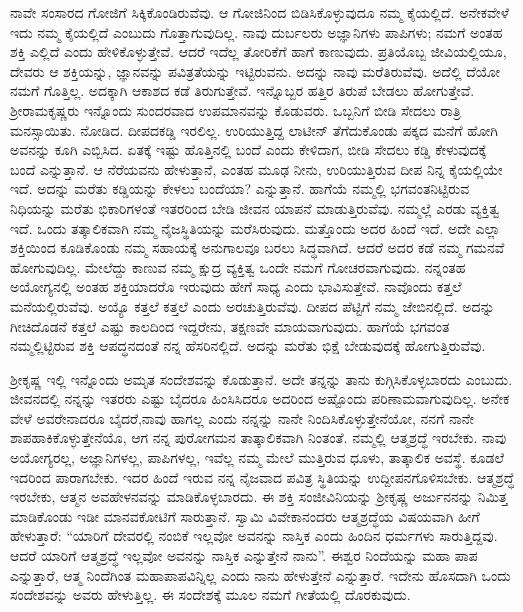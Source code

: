 ನಾವೇ ಸಂಸಾರದ ಗೋಜಿಗೆ ಸಿಕ್ಕಿಕೊಂಡಿರುವೆವು. ಆ ಗೋಜಿನಿಂದ ಬಿಡಿಸಿಕೊಳ್ಳುವುದೂ ನಮ್ಮ ಕೈಯಲ್ಲಿದೆ. ಅನೇಕವೇಳೆ ಇದು ನಮ್ಮ ಕೈಯಲ್ಲಿದೆ ಎಂಬುದು ಗೊತ್ತಾಗುವುದಿಲ್ಲ. ನಾವು ದುರ್ಬಲರು ಅಜ್ಞಾನಿಗಳು ಪಾಪಿಗಳು; ನಮಗೆ ಅಂತಹ ಶಕ್ತಿ ಎಲ್ಲಿದೆ ಎಂದು ಹೇಳಿಕೊಳ್ಳುತ್ತೇವೆ. ಆದರೆ ಇದೆಲ್ಲ ತೋರಿಕೆಗೆ ಹಾಗೆ ಕಾಣುವುದು. ಪ್ರತಿಯೊಬ್ಬ ಜೀವಿಯಲ್ಲಿಯೂ, ದೇವರು ಆ ಶಕ್ತಿಯನ್ನು, ಜ್ಞಾನವನ್ನು ಪವಿತ್ರತೆಯನ್ನು ಇಟ್ಟಿರುವನು. ಅದನ್ನು ನಾವು ಮರೆತಿರುವೆವು. ಅದೆಲ್ಲಿ ದೆಯೋ ನಮಗೆ ಗೊತ್ತಿಲ್ಲ. ಅದಕ್ಕಾಗಿ ಆಕಾಶದ ಕಡೆ ತಿರುಗುತ್ತೇವೆ. ಇನ್ನೊಬ್ಬರ ಹತ್ತಿರ ತಿರುಪೆ ಬೇಡಲು ಹೋಗುತ್ತೇವೆ. ಶ‍್ರೀರಾಮಕೃಷ್ಣರು ಇನ್ನೊಂದು ಸುಂದರವಾದ ಉಪಮಾನವನ್ನು ಕೊಡುವರು. ಒಬ್ಬನಿಗೆ ಬೀಡಿ ಸೇದಲು ರಾತ್ರಿ ಮನಸ್ಸಾಯಿತು. ನೋಡಿದ. ದೀಪದಕಡ್ಡಿ ಇರಲಿಲ್ಲ. ಉರಿಯುತ್ತಿದ್ದ ಲಾಟೀನ್ ತೆಗೆದುಕೊಂಡು ಪಕ್ಕದ ಮನೆಗೆ ಹೋಗಿ ಅವನನ್ನು ಕೂಗಿ ಎಬ್ಬಿಸಿದ. ಏತಕ್ಕೆ ಇಷ್ಟು ಹೊತ್ತಿನಲ್ಲಿ ಬಂದೆ ಎಂದು ಕೇಳಿದಾಗ, ಬೀಡಿ ಸೇದಲು ಕಡ್ಡಿ ಕೇಳುವುದಕ್ಕೆ ಬಂದೆ ಎನ್ನುತ್ತಾನೆ. ಆ ನೆರೆಯವನು ಹೇಳುತ್ತಾನೆ, ಎಂತಹ ಮೂಢ ನೀನು, ಉರಿಯುತ್ತಿರುವ ದೀಪ ನಿನ್ನ ಕೈಯಲ್ಲಿಯೇ ಇದೆ. ಅದನ್ನು ಮರೆತು ಕಡ್ಡಿಯನ್ನು ಕೇಳಲು ಬಂದೆಯಾ? ಎನ್ನುತ್ತಾನೆ. ಹಾಗೆಯೆ ನಮ್ಮಲ್ಲಿ ಭಗವಂತನಿಟ್ಟಿರುವ ನಿಧಿಯನ್ನು ಮರೆತು ಭಿಕಾರಿಗಳಂತೆ ಇತರರಿಂದ ಬೇಡಿ ಜೀವನ ಯಾಪನೆ ಮಾಡುತ್ತಿರುವೆವು. ನಮ್ಮಲ್ಲೆ ಎರಡು ವ್ಯಕ್ತಿತ್ವ ಇದೆ. ಒಂದು ತತ್ಕಾಲಿಕವಾಗಿ ನಮ್ಮ ನೈಜಸ್ಥಿತಿಯನ್ನು ಮರೆಸಿರುವುದು. ಮತ್ತೊಂದು ಅದರ ಹಿಂದೆ ಇದೆ. ಅದೇ ಎಲ್ಲಾ ಶಕ್ತಿಯಿಂದ ಕೂಡಿಕೊಂಡು ನಮ್ಮ ಸಹಾಯಕ್ಕೆ ಅನುಗಾಲವೂ ಬರಲು ಸಿದ್ಧವಾಗಿದೆ. ಆದರೆ ಅದರ ಕಡೆ ನಮ್ಮ ಗಮನವೆ ಹೋಗುವುದಿಲ್ಲ. ಮೇಲೆದ್ದು ಕಾಣುವ ನಮ್ಮ ಕ್ಷುದ್ರ ವ್ಯಕ್ತಿತ್ವ ಒಂದೇ ನಮಗೆ ಗೋಚರವಾಗುವುದು. ನನ್ನಂತಹ ಅಯೋಗ್ಯನಲ್ಲಿ ಅಂತಹ ಶಕ್ತಿಯಾದರೊ ಇರುವುದು ಹೇಗೆ ಸಾಧ್ಯ ಎಂದು ಭಾವಿಸುತ್ತೇವೆ. ನಾವೊಂದು ಕತ್ತಲೆ ಮನೆಯಲ್ಲಿರುವೆವು. ಅಯ್ಯೊ ಕತ್ತಲೆ ಕತ್ತಲೆ ಎಂದು ಅರಚುತ್ತಿರುವೆವು. ದೀಪದ ಪೆಟ್ಟಿಗೆ ನಮ್ಮ ಜೇಬಿನಲ್ಲಿದೆ. ಅದನ್ನು ಗೀಚಿದೊಡನೆ ಕತ್ತಲೆ ಎಷ್ಟು ಕಾಲದಿಂದ ಇದ್ದರೇನು, ತಕ್ಷಣವೇ ಮಾಯವಾಗುವುದು. ಹಾಗೆಯೆ ಭಗವಂತ ನಮ್ಮಲ್ಲಿಟ್ಟಿರುವ ಶಕ್ತಿ ಆಪದ್ಧನದಂತೆ ನನ್ನ ಹೆಸರಿನಲ್ಲಿದೆ. ಅದನ್ನು ಮರೆತು ಭಿಕ್ಷೆ ಬೇಡುವುದಕ್ಕೆ ಹೋಗುತ್ತಿರುವೆವು.

ಶ‍್ರೀಕೃಷ್ಣ ಇಲ್ಲಿ ಇನ್ನೊಂದು ಅಮೃತ ಸಂದೇಶವನ್ನು ಕೊಡುತ್ತಾನೆ. ಅದೇ ತನ್ನನ್ನು ತಾನು ಕುಗ್ಗಿಸಿಕೊಳ್ಳಬಾರದು ಎಂಬುದು. ಜೀವನದಲ್ಲಿ ನನ್ನನ್ನು ಇತರರು ಎಷ್ಟು ಬೈದರೂ ಹಿಂಸಿಸಿದರೂ ಅದರಿಂದ ಅಷ್ಟೊಂದು ಪರಿಣಾಮವಾಗುವುದಿಲ್ಲ. ಅನೇಕ ವೇಳೆ ಅವರೇನಾದರೂ ಬೈದರೆ,\break ನಾವು ಹಾಗಲ್ಲ ಎಂದು ನನ್ನನ್ನು ನಾನೇ ನಿಂದಿಸಿಕೊಳ್ಳುತ್ತೇನೆಯೋ, ನನಗೆ ನಾನೇ ಶಾಪ\break ಹಾಕಿಕೊಳ್ಳುತ್ತೇ\-ನೆಯೊ, ಆಗ ನನ್ನ ಪುರೋಗಮನ ತಾತ್ಕಾಲಿಕವಾಗಿ ನಿಂತಂತೆ. ನಮ್ಮಲ್ಲಿ ಆತ್ಮಶ್ರದ್ಧೆ ಇರಬೇಕು. ನಾವು ಅಯೋಗ್ಯರಲ್ಲ, ಅಜ್ಞಾನಿಗಳಲ್ಲ, ಪಾಪಿಗಳಲ್ಲ, ಇವೆಲ್ಲ ನಮ್ಮ ಮೇಲೆ ಮುತ್ತಿರುವ ಧೂಳು, ತಾತ್ಕಾಲಿಕ ಅವಸ್ಥೆ. ಕೂಡಲೆ ಇದರಿಂದ ಪಾರಾಗಬೇಕು. ಇದರ ಹಿಂದೆ ಇರುವ ನನ್ನ ನೈಜವಾದ ಪವಿತ್ರ ಸ್ಥಿತಿಯನ್ನು ಉದ್ದೀಪನಗೊಳಿಸಬೇಕು. ಆತ್ಮಶ್ರದ್ಧೆ ಇರಬೇಕು, ಆತ್ಮನ ಅವಹೇಳನವನ್ನು ಮಾಡಿಕೊಳ್ಳಬಾರದು. ಈ ಶಕ್ತಿ ಸಂಜೀವಿನಿಯನ್ನು ಶ‍್ರೀಕೃಷ್ಣ ಅರ್ಜುನನನ್ನು ನಿಮಿತ್ತ ಮಾಡಿಕೊಂಡು ಇಡೀ ಮಾನವಕೋಟಿಗೆ ಸಾರುತ್ತಾನೆ. ಸ್ವಾಮಿ ವಿವೇಕಾನಂದರು ಆತ್ಮಶ್ರದ್ಧೆಯ ವಿಷಯವಾಗಿ ಹೀಗೆ ಹೇಳುತ್ತಾರೆ: “ಯಾರಿಗೆ ದೇವರಲ್ಲಿ ನಂಬಿಕೆ ಇಲ್ಲವೋ ಅವನನ್ನು ನಾಸ್ತಿಕ ಎಂದು ಹಿಂದಿನ ಧರ್ಮಗಳು ಸಾರುತ್ತಿದ್ದವು. ಆದರೆ ಯಾರಿಗೆ ಆತ್ಮಶ್ರದ್ಧೆ ಇಲ್ಲವೋ ಅವನನ್ನು ನಾಸ್ತಿಕ ಎನ್ನುತ್ತೇನೆ ನಾನು”. ಈಶ್ವರ ನಿಂದೆಯನ್ನು ಮಹಾ ಪಾಪ ಎನ್ನುತ್ತಾರೆ, ಆತ್ಮ ನಿಂದೆಗಿಂತ ಮಹಾಪಾಪವಿನ್ನಿಲ್ಲ ಎಂದು ನಾನು ಹೇಳುತ್ತೇನೆ ಎನ್ನುತ್ತಾರೆ. ಇದೇನು ಹೊಸದಾಗಿ ಒಂದು ಸಂದೇಶವನ್ನು ಅವರು ಹೇಳುತ್ತಿಲ್ಲ. ಈ ಸಂದೇಶಕ್ಕೆ ಮೂಲ ನಮಗೆ ಗೀತೆಯಲ್ಲಿ ದೊರಕುವುದು.

